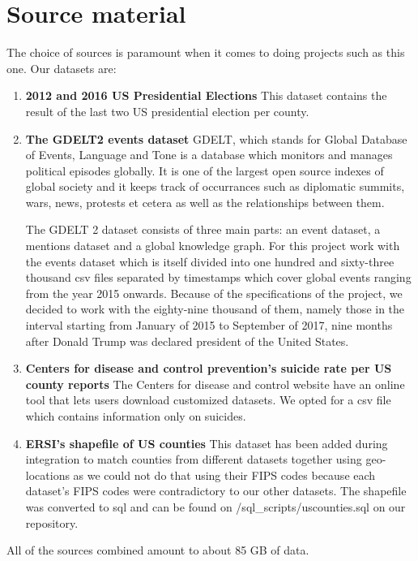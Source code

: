 \section{Source material}

The choice of sources is paramount when it comes to doing projects
such as this one. Our datasets are:
\begin{enumerate}
	\item \textbf{2012 and 2016 US Presidential Elections} \cite{kaggle-website}
		This dataset contains the result of the last two US presidential
		election per county.

	\item \textbf{The GDELT2 events dataset} \cite{gdelt-website}
		GDELT, which stands for Global Database of Events, Language
		and Tone is a database which monitors and manages
		political episodes globally. It is one of the largest
		open source indexes of global society
		and it keeps track of occurrances
		such as diplomatic summits, wars, news, protests et
		cetera as well as the relationships between them.


		The GDELT 2 dataset consists of three main parts: an
		event dataset, a mentions dataset and a global knowledge
		graph. For this project work with the events dataset
		which is itself divided into one hundred and sixty-three
		thousand csv files separated by timestamps which cover
		global events ranging from the year 2015 onwards.
		Because of the specifications of the project, we decided
		to work with the eighty-nine thousand of them, namely
		those in the interval starting from January of 2015 to
		September of 2017, nine months after Donald Trump
		was declared president of the United States.


	\item \textbf{Centers for disease and control prevention's
		suicide rate per US county reports}\cite{suicide-website}
		The Centers for disease and control website have an online
		tool that lets users download customized datasets.
		We opted for a csv file which contains information only
		on suicides.

	\item \textbf{ERSI's shapefile of US counties}\cite{esri-website}
		This dataset has been added during integration to
		match counties from different datasets together
		using geo-locations
		as we could not do that using
		their FIPS codes because each dataset's FIPS codes
		were contradictory to our other datasets.
		The shapefile was converted to sql and can be found
		on /sql\_scripts/uscounties.sql on our repository.


\end{enumerate}
All of the sources combined amount to about 85 GB of data.

